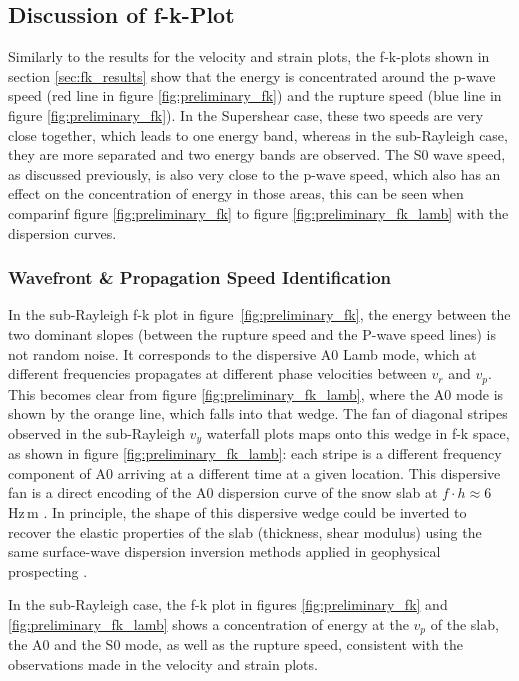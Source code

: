 \subsection{Discussion of f-k-Plot}

Similarly to the results for the velocity and strain plots, the f-k-plots shown in section \ref{sec:fk_results} show that the energy is concentrated around the p-wave speed (red line in figure \ref{fig:preliminary_fk}) and the rupture speed (blue line in figure \ref{fig:preliminary_fk}). In the Supershear case, these two speeds are very close together, which leads to one energy band, whereas in the sub-Rayleigh case, they are more separated and two energy bands are observed. The S0 wave speed, as discussed previously, is also very close to the p-wave speed, which also has an effect on the concentration of energy in those areas, this can be seen when comparinf figure \ref{fig:preliminary_fk} to figure \ref{fig:preliminary_fk_lamb} with the dispersion curves. \par

\subsubsection{Wavefront \& Propagation Speed Identification}
In the sub-Rayleigh f-k plot in figure~\ref{fig:preliminary_fk}, the energy
between the two dominant slopes (between the rupture speed and the P-wave speed lines) is not random noise. It corresponds to the dispersive
A0 Lamb mode, which at different frequencies propagates at different phase
velocities between \(v_r\) and \(v_p\). This becomes clear from figure \ref{fig:preliminary_fk_lamb}, where the A0 mode is shown by the orange line, which falls into that wedge. The fan of diagonal stripes observed in the sub-Rayleigh \(v_y\) waterfall plots maps onto this wedge in f-k space, as shown in figure \ref{fig:preliminary_fk_lamb}: each stripe is a different frequency component of A0 arriving at a different time at a given location. This dispersive fan is a direct encoding of the A0 dispersion curve of the snow slab at \(f \cdot h \approx 6\) Hz\,m \parencite{roseWavesPlates2014, lambWavesElasticPlate1917}. In principle, the shape of this dispersive wedge could be inverted to recover the elastic properties of the slab (thickness, shear modulus) using the same surface-wave dispersion
inversion methods applied in geophysical prospecting \parencite{yilmazSeismicDataAnalysis2001}. \par

In the sub-Rayleigh case, the f-k plot in figures \ref{fig:preliminary_fk} and \ref{fig:preliminary_fk_lamb} shows a concentration of energy at the \(v_p\) of the slab, the A0 and the S0 mode, as well as the rupture speed, consistent with the observations made in the velocity and strain plots. \par

